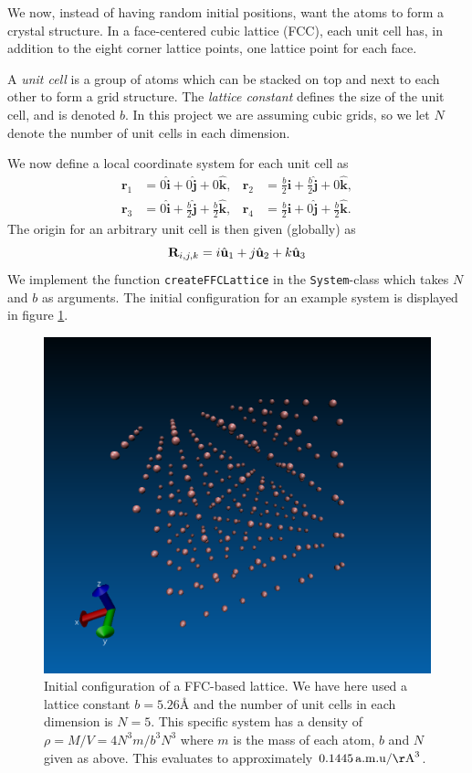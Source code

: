 \documentclass[a4paper]{article}
\renewcommand{\vec}[1]{\mathbf{#1}}
\begin{document}
    We now, instead of having random initial positions, want the atoms to form
    a crystal structure. In a face-centered cubic lattice (FCC), each unit cell
    has, in addition to the eight corner lattice points, one lattice point for
    each face.

    A \emph{unit cell} is a group of atoms which can be stacked on top and next
    to each other to form a grid structure. The \emph{lattice constant} defines
    the size of the unit cell, and is denoted $b$. In this project we are
    assuming cubic grids, so we let $N$ denote the number of unit cells in each
    dimension.
    
    We now define a local coordinate system for each unit cell as
    \begin{align*}
        \vec{r}_1 &= 0\hat{\vec{i}} + 0\hat{\vec{j}} + 0\hat{\vec{k}}, &
        \vec{r}_2 &= \frac{b}{2}\hat{\vec{i}} + \frac{b}{2}\hat{\vec{j}} +
        0\hat{\vec{k}},\\ \vec{r}_3 &= 0\hat{\vec{i}} +
        \frac{b}{2}\hat{\vec{j}} + \frac{b}{2}\hat{\vec{k}}, & \vec{r}_4 &=
        \frac{b}{2}\hat{\vec{i}} + 0\hat{\vec{j}} + \frac{b}{2}\hat{\vec{k}}.
    \end{align*}
    The origin for an arbitrary unit cell is then given (globally) as
    \begin{equation}
        \notag \vec{R}_{i, j, k} = i\hat{\vec{u}}_1 + j\hat{\vec{u}}_2 +
        k\hat{\vec{u}}_3
    \end{equation}
    We implement the function \texttt{createFFCLattice} in the
    \texttt{System}-class which takes $N$ and $b$ as arguments. The initial
    configuration for an example system is displayed in figure
    \ref{fig:ffc_iteration}.
    \begin{figure}
        \centering \includegraphics[width=0.4\linewidth]{ffc_iteration}
        \caption[Crystallic structure in argon]{Initial configuration of a
            FFC-based lattice. We have here used a lattice constant $b =
            5.26${\AA} and the number of unit cells in each dimension is $N =
            5$. This specific system has a density of $\rho = M / V = 4N^3m /
            b^3N^3$ where $m$ is the mass of each atom, $b$ and $N$ given as
            above. This evaluates to approximately $0.1445 \,\mathrm{a.m.u} /
        \mathrm{\AA}^3$.}
        \label{fig:ffc_iteration}
    \end{figure}
    
\end{document}
